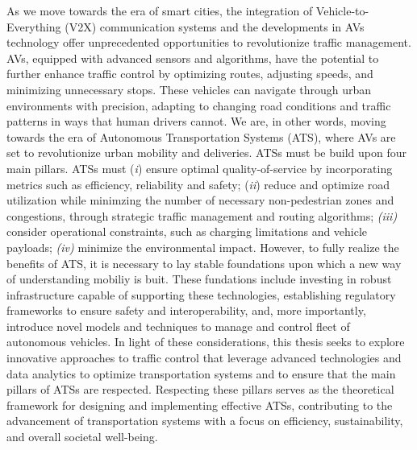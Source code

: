 As we move towards the era of smart cities, the integration of Vehicle-to-Everything (V2X) communication systems and the developments in AVs technology offer unprecedented opportunities to revolutionize traffic management. AVs, equipped with advanced sensors and algorithms, have the potential to further enhance traffic control by optimizing routes, adjusting speeds, and minimizing unnecessary stops. These vehicles can navigate through urban environments with precision, adapting to changing road conditions and traffic patterns in ways that human drivers cannot. We are, in other words, moving towards the era of Autonomous Transportation Systems (ATS), where AVs are set to revolutionize urban mobility and deliveries. ATSs must be build upon four main pillars. ATSs must (\textit{i}) ensure optimal quality-of-service by incorporating metrics such as efficiency, reliability and safety; (\textit{ii}) reduce and optimize road utilization while minimzing the number of necessary non-pedestrian zones and congestions, through strategic traffic management and routing algorithms; \textit{(iii)} consider operational constraints, such as charging limitations and vehicle payloads; \textit{(iv)} minimize the environmental impact. 
However, to fully realize the benefits of ATS, it is necessary to lay stable foundations upon which a new way of understanding mobiliy is buit. These fundations include investing in robust infrastructure capable of supporting these technologies, establishing regulatory frameworks to ensure safety and interoperability, and, more importantly, introduce novel models and techniques to manage and control fleet of autonomous vehicles. In light of these considerations, this thesis seeks to explore innovative approaches to traffic control that leverage advanced technologies and data analytics to optimize transportation systems and to ensure that the main pillars of ATSs are respected. Respecting these pillars serves as the theoretical framework for designing and implementing effective ATSs, contributing to the advancement of transportation systems with a focus on efficiency, sustainability, and overall societal well-being.

